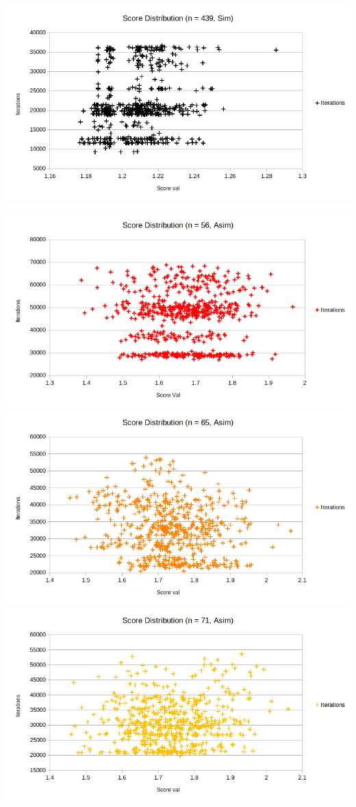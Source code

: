 \documentclass{article}
\begin{document}
\includegraphics[scale=0.36]{simDist439}

\includegraphics[scale=0.36]{asimDist56}
\includegraphics[scale=0.36]{asimDist65}
\includegraphics[scale=0.36]{asimDist71}
\end{document}
